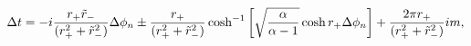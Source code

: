 \begin{equation} \label{esing}
\Delta t = -i {r_+ \tilde{r}_- \over (r_+^2 + \tilde{r}_-^2)} \Delta
\phi_n \pm {r_+ \over (r_+^2 + \tilde{r}_-^2)} \cosh^{-1} \left[
\sqrt{ \alpha \over \alpha-1} \cosh r_+ \Delta \phi_n \right] + {2\pi
r_+ \over (r_+^2 + \tilde{r}_-^2)} i m,
\end{equation}

